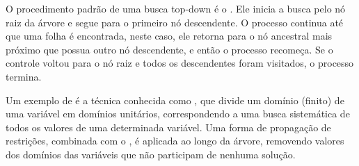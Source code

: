 \begin{itemize}
{  O procedimento padrão de uma busca top-down é
  o . Ele inicia a busca pelo nó raiz da árvore e
  segue para o primeiro nó descendente. O processo continua até que
  uma folha é encontrada, neste caso, ele retorna para o nó ancestral
  mais próximo que possua outro nó descendente, e então o processo
  recomeça. Se o controle voltou para o nó raiz e todos os
  descendentes foram visitados, o processo termina.

  Um exemplo de  é a técnica conhecida
  como , que divide um domínio (finito) de uma
  variável em domínios unitários, correspondendo a uma busca
  sistemática de todos os valores de uma determinada variável. Uma
  forma de propagação de restrições, combinada com o ,
  é aplicada ao longo da árvore, removendo valores dos domínios das
  variáveis que não participam de nenhuma solução.}

\end{itemize}
